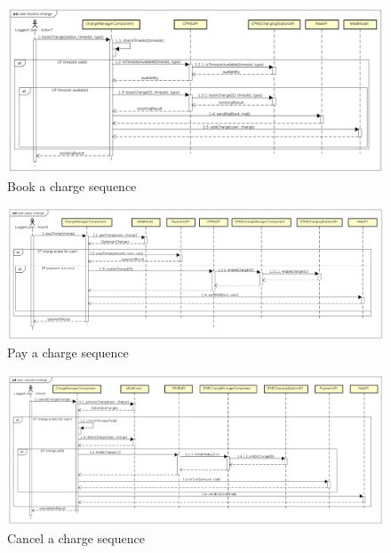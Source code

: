 \begin{figure}[!h]
    \begin{center}
        \includegraphics[keepaspectratio, width=16cm]{Sequence/user-books-charge.png}
        \caption{Book a charge sequence}
        \label{fig:user-books-charge}
    \end{center}
\end{figure}
\begin{figure}[!h]
    \begin{center}
        \includegraphics[keepaspectratio, width=16cm]{Sequence/user-pays-charge.png}
        \caption{Pay a charge sequence}
        \label{fig:user-pays-charge}
    \end{center}
\end{figure}
\begin{figure}[!h]
    \begin{center}
        \includegraphics[keepaspectratio, width=16cm]{Sequence/user-cancels-charge.png}
        \caption{Cancel a charge sequence}
        \label{fig:user-cancels-charge}
    \end{center}
\end{figure}
